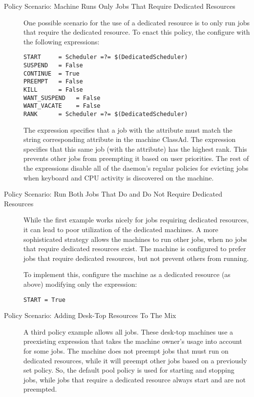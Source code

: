 \begin{description}
\item[Policy Scenario: Machine Runs Only Jobs That Require Dedicated Resources]

One possible scenario for the use of a dedicated resource
is to only run jobs that require the dedicated resource.
To enact this policy, the configure with the following expressions:

\begin{verbatim}
START     = Scheduler =?= $(DedicatedScheduler)
SUSPEND   = False
CONTINUE  = True
PREEMPT   = False
KILL      = False
WANT_SUSPEND   = False
WANT_VACATE    = False
RANK      = Scheduler =?= $(DedicatedScheduler)
\end{verbatim}

The  expression specifies that a job with the 
attribute must match the string corresponding
 attribute in the machine ClassAd.
The  expression specifies that this same job 
(with the  attribute)
has the highest rank.
This prevents other jobs from preempting it based on user priorities.
The rest of the expressions disable all of the  daemon's
regular policies for evicting jobs when keyboard and CPU activity is
discovered on the machine.


\item[Policy Scenario: Run Both Jobs That Do and Do Not Require Dedicated Resources]

While the first example works nicely for jobs requiring
dedicated resources,
it can 
lead to poor utilization of the dedicated machines.  
A more sophisticated strategy allows 
the machines to run other jobs, when no jobs that
require dedicated resources exist.
The machine is
configured to prefer jobs that require dedicated resources,
but not prevent others from running.

To implement this,
configure the machine as a dedicated resource (as above)
modifying only the  expression:

\begin{verbatim}
START = True
\end{verbatim}

\item[Policy Scenario: Adding Desk-Top Resources To The Mix]

A third policy example allows all jobs.
These desk-top machines use a preexisting  expression that
takes the machine owner's usage into account for some jobs.
The machine does not preempt jobs that must run on dedicated
resources,
while it will preempt other jobs based on a previously set
policy.
So, the default pool policy is used for starting and
stopping jobs, while jobs that require a dedicated resource always start 
and are not preempted.


\end{description}
